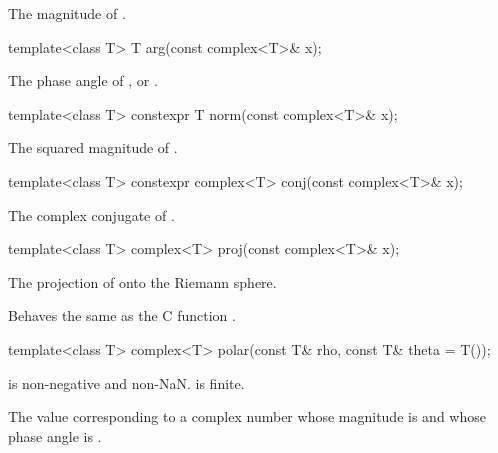 \begin{itemdescr}
\pnum
\returns
The magnitude of .
\end{itemdescr}

%
\begin{itemdecl}
template<class T> T arg(const complex<T>& x);
\end{itemdecl}

\begin{itemdescr}
\pnum
\returns
The phase angle of , or .
\end{itemdescr}

%
\begin{itemdecl}
template<class T> constexpr T norm(const complex<T>& x);
\end{itemdecl}

\begin{itemdescr}
\pnum
\returns
The squared magnitude of .
\end{itemdescr}

%
\begin{itemdecl}
template<class T> constexpr complex<T> conj(const complex<T>& x);
\end{itemdecl}

\begin{itemdescr}
\pnum
\returns
The complex conjugate of .
\end{itemdescr}

%
\begin{itemdecl}
template<class T> complex<T> proj(const complex<T>& x);
\end{itemdecl}

\begin{itemdescr}
\pnum
\returns
The projection of  onto the Riemann sphere.

\pnum
\remarks
Behaves the same as the C function .
\end{itemdescr}

%
\begin{itemdecl}
template<class T> complex<T> polar(const T& rho, const T& theta = T());
\end{itemdecl}

\begin{itemdescr}
\pnum
\expects
{} is non-negative and non-NaN\@.  is finite.

\pnum
\returns
The
value corresponding
to a complex number whose magnitude is  and whose phase angle
is .
\end{itemdescr}


